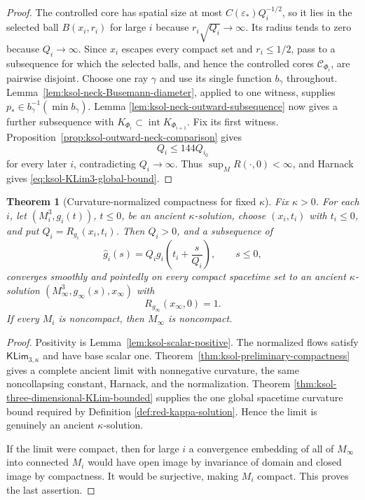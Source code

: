 \documentclass[10pt]{coll-l}
\newtheorem{theorem}{Theorem}[chapter]
\theoremstyle{definition}
\theoremstyle{remark}
\numberwithin{section}{chapter}
\numberwithin{equation}{chapter}
\begin{document}
\begin{proof}
The controlled core has spatial size at most
$C(\varepsilon_*)Q_i^{-1/2}$, so it lies in the selected ball
$B(x_i,r_i)$ for large $i$ because $r_i\sqrt{Q_i}\to\infty$.  Its radius
tends to zero because $Q_i\to\infty$.  Since $x_i$ escapes every compact
set and $r_i\leq1/2$, pass to a subsequence for which the selected balls,
and hence the controlled cores $\mathcal C_{\Phi_i}$, are pairwise
disjoint.  Choose one ray $\gamma$ and use its single function $b_\gamma$
throughout.  Lemma~\ref{lem:ksol-neck-Busemann-diameter}, applied to one
witness, supplies $p_*\in b_\gamma^{-1}(\min b_\gamma)$.  Lemma
\ref{lem:ksol-neck-outward-subsequence} now gives a further subsequence
with $K_{\Phi_i}\subset\operatorname{int}K_{\Phi_{i+1}}$.  Fix its first
witness.  Proposition~\ref{prop:ksol-outward-neck-comparison} gives
\[
                         Q_i\leq144Q_{i_0}
\]
for every later $i$, contradicting $Q_i\to\infty$.  Thus
$\sup_MR(\cdot,0)<\infty$, and Harnack gives
\eqref{eq:ksol-KLim3-global-bound}.
\end{proof}

\begin{theorem}[Curvature-normalized compactness for fixed $\kappa$]
\label{thm:ksol-fixed-kappa-compactness}
Fix $\kappa>0$.  For each $i$, let $(M_i^3,g_i(t))$, $t\leq0$, be an ancient
$\kappa$-solution, choose $(x_i,t_i)$ with $t_i\leq0$, and put
$Q_i=R_{g_i}(x_i,t_i)$.  Then $Q_i>0$, and a subsequence of
\begin{equation}
 \widehat g_i(s)=Q_i g_i\!\left(t_i+\frac{s}{Q_i}\right),
 \qquad s\leq0,                                       \label{eq:ksol-fixed-kappa-normalized-sequence}
\end{equation}
converges smoothly and pointedly on every compact spacetime set to an
ancient $\kappa$-solution
$(M_\infty^3,g_\infty(s),x_\infty)$ with
\begin{equation}
                         R_{g_\infty}(x_\infty,0)=1.   \label{eq:ksol-fixed-limit-normalization}
\end{equation}
If every $M_i$ is noncompact, then $M_\infty$ is noncompact.
\end{theorem}

\begin{proof}
Positivity is Lemma~\ref{lem:ksol-scalar-positive}.  The normalized flows
satisfy $\mathsf{KLim}_{3,\kappa}$ and have base scalar one.
Theorem~\ref{thm:ksol-preliminary-compactness} gives a complete ancient
limit with nonnegative curvature, the same noncollapsing constant, Harnack,
and the normalization.  Theorem
\ref{thm:ksol-three-dimensional-KLim-bounded} supplies the one global
spacetime curvature bound required by Definition
\ref{def:red-kappa-solution}.  Hence the limit is genuinely an ancient
$\kappa$-solution.

If the limit were compact, then for large $i$ a convergence embedding of
all of $M_\infty$ into connected $M_i$ would have open image by invariance
of domain and closed image by compactness.  It would be surjective, making
$M_i$ compact.  This proves the last assertion.
\end{proof}
\end{document}
